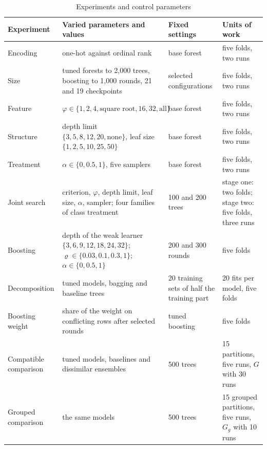 \documentclass[10pt,conference]{IEEEtran}
\begin{document}
\begin{table}[t]
\caption{Experiments and control parameters}
\label{tab:experiments}
\centering
\footnotesize
\begin{tabular}{p{}p{}p{}p{}}
\toprule
Experiment & Varied parameters and values & Fixed settings & Units of work \\
\midrule
Encoding & one-hot against ordinal rank & base forest & five folds, two runs \\
Size & tuned forests to 2,000 trees, boosting to 1,000 rounds, 21 and 19 checkpoints & selected configurations & five folds, two runs \\
Feature & $\varphi \in \{1, 2, 4, \text{square root}, 16, 32, \text{all}\}$ & base forest & five folds, two runs \\
Structure & depth limit $\{3, 5, 8, 12, 20, \text{none}\}$, leaf size $\{1, 2, 5, 10, 25, 50\}$ & base forest & five folds, two runs \\
Treatment & $\alpha \in \{0, 0.5, 1\}$, five samplers & base forest & five folds, two runs \\
Joint search & criterion, $\varphi$, depth limit, leaf size, $\alpha$, sampler; four families of class treatment & 100 and 200 trees & stage one: two folds; stage two: five folds, three runs \\
Boosting & depth of the weak learner $\{3, 6, 9, 12, 18, 24, 32\}$;\newline $\varrho \in \{0.03, 0.1, 0.3, 1\}$; $\alpha \in \{0, 0.5, 1\}$ & 200 and 300 rounds & five folds \\
Decomposition & tuned models, bagging and baseline trees & 20 training sets of half the training part & 20 fits per model, five folds \\
Boosting weight & share of the weight on conflicting rows after selected rounds & tuned boosting & five folds \\
Compatible comparison & tuned models, baselines and dissimilar ensembles & 500 trees & 15 partitions, five runs, $G$ with 30 runs \\
Grouped comparison & the same models & 500 trees & 15 grouped partitions, five runs, $G_{g}$ with 10 runs \\
\bottomrule
\end{tabular}
\end{table}
\end{document}
